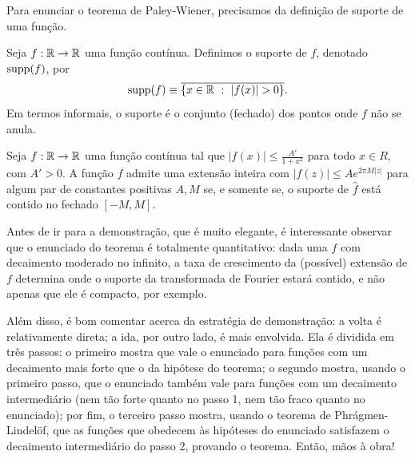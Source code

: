         Para enunciar o teorema de Paley-Wiener, precisamos da definição de suporte de uma função.
        \begin{definicao}
        \label{def-suporte}
            Seja $f:\mathbb{R}\to\mathbb{R}$ uma função contínua. Definimos o suporte de $f$, denotado $\operatorname{supp}(f)$, por
            \begin{equation*}
                \operatorname{supp}(f) \equiv \overline{\{ x\in\mathbb{R} \ : \ |f(x)| > 0 \}}.
            \end{equation*}
            Em termos informais, o suporte é o conjunto (fechado) dos pontos onde $f$ não se anula.
        \end{definicao}
        \begin{teorema}
        \label{teo-paley-wiener}
            Seja $f:\mathbb{R}\to\mathbb{R}$ uma função contínua tal que $\displaystyle{ |f(x)| \leq \frac{A'}{1+x^2} }$
            para todo $x\in R$, com $A'>0$. A função $f$ admite uma extensão inteira com
            $|f(z)| \leq Ae^{2\pi M|z|}$ para algum par de constantes positivas $A,M$ se, e somente se,
            o suporte de $\widehat{f}$ está contido no fechado $[-M,M]$.
        \end{teorema}
        Antes de ir para a demonstração, que é muito elegante, é interessante observar que o enunciado
        do teorema é totalmente quantitativo: dada uma $f$ com decaimento moderado no infinito, 
        a taxa de crescimento da (possível) extensão de $f$ determina onde
        o suporte da transformada de Fourier estará contido, e não apenas que ele é compacto, por exemplo.
        
        Além disso, é bom comentar acerca da estratégia de demonstração: a volta é relativamente direta;
        a ida, por outro lado, é mais envolvida. Ela é dividida em três passos: o primeiro mostra que
        vale o enunciado para funções com um decaimento mais forte que o da hipótese do teorema; o
        segundo mostra, usando o primeiro passo, que o enunciado também vale para funções com um 
        decaimento intermediário (nem tão forte quanto no passo 1, nem tão fraco quanto no enunciado);
        por fim, o terceiro passo mostra, usando o teorema de Phrágmen-Lindelöf, que as funções
        que obedecem às hipóteses do enunciado satisfazem o decaimento intermediário do passo 2, 
        provando o teorema. Então, mãos à obra!
        
